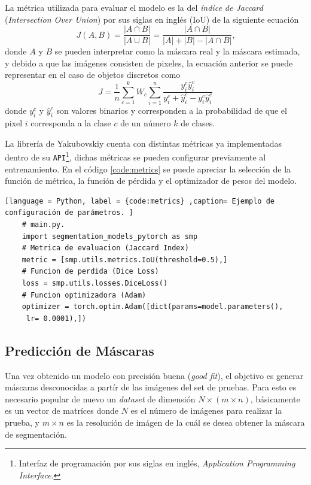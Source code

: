 La métrica utilizada para evaluar el modelo es la del \emph{índice de Jaccard} (\emph{Intersection Over Union}) por sus siglas en inglés (IoU) \citep{fpn_1} de la siguiente ecuación
\begin{equation}\label{eq:jacc}
    J(A,B) = \frac{|A \cap B|}{| A \cup B |} = \frac{|A \cap B|}{|A| + |B| - |A \cap B|} \text{,}
\end{equation} 
donde $A$ y $B$ se pueden interpretar como la máscara real y la máscara estimada, y debido a que las imágenes consisten de pixeles, la ecuación anterior se puede representar en el caso de objetos discretos como
\begin{equation}
    J = \frac{1}{n} \sum_{c=1}^{k} W_c \sum_{i=1}^{n}\frac{y_i^c \hat y_i^c}{y_i^c + \hat y_i^c - y_i^c \hat y_i^c}
\end{equation} 
donde $y_i^c$ y $\hat y_i^c$ son valores binarios y corresponden a la probabilidad de que el pixel $i$ corresponda a la clase $c$ de un número $k$ de clases.

La librería de Yakubovskiy \citep{Yakubovskiy:2019} cuenta con distintas métricas ya implementadas dentro de su \texttt{API}\footnote{Interfaz de programación por sus siglas en inglés, \emph{Application Programming Interface}.}, dichas métricas se pueden configurar previamente al entrenamiento. En el código \ref{code:metrics} se puede apreciar la selección de la función de métrica, la función de pérdida y el optimizador de pesos del modelo.

\begin{lstlisting}[language = Python, label = {code:metrics} ,caption= Ejemplo de configuración de parámetros. ]
    # main.py.
    import segmentation_models_pytorch as smp 
    # Metrica de evaluacion (Jaccard Index)
    metric = [smp.utils.metrics.IoU(threshold=0.5),]
    # Funcion de perdida (Dice Loss)
    loss = smp.utils.losses.DiceLoss()
    # Funcion optimizadora (Adam)
    optimizer = torch.optim.Adam([dict(params=model.parameters(),
     lr= 0.0001),])
\end{lstlisting}

\subsection{Predicción de Máscaras} 
Una vez obtenido un modelo con precisión buena (\emph{good fit}), el objetivo es generar máscaras desconocidas a partír de las imágenes del set de pruebas. Para esto es necesario popular de nuevo un \emph{dataset} de dimensión $N \times (m \times n)$, básicamente es un vector de matríces donde $N$ es el número de imágenes para realizar la prueba, y $m \times n$ es la resolución de imágen de la cuál se desea obtener la máscara de segmentación.

